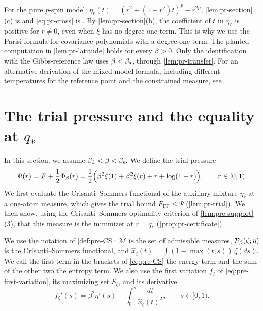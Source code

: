 \begin{remark}\label{rem:pr-cross}
For the pure $p$-spin model, $\eta_r(t)=(r^2+(1-r^2)t)^p-r^{2p}$, \cref{lem:pr-section}(c) is \cite[Proposition~3.7]{ElAlaouiMontanariSellke2025} and \eqref{eq:pr-cross} is \cite[Proposition~3.8]{ElAlaouiMontanariSellke2025}. By \cref{lem:pr-section}(b), the coefficient of $t$ in $\eta_r$ is positive for $r\ne0$, even when $\xi$ has no degree-one term. This is why we use the Parisi formula for covariance polynomials with a degree-one term. The planted computation in \cref{lem:pr-latitude} holds for every $\beta>0$. Only the identification with the Gibbs-reference law uses $\beta<\beta_{\mathrm s}$, through \cref{lem:pr-transfer}. For an alternative derivation of the mixed-model formula, including different temperatures for the reference point and the constrained measure, see \cite[Corollary~2.1 and Eqs.~(2.4)--(2.7)]{DemboSubag2026}.
\end{remark}


\section{The trial pressure and the equality at \texorpdfstring{$q_*$}{q*}}\label{sec:pr-certificate}

In this section, we assume $\beta_{\mathrm d}<\beta<\beta_{\mathrm s}$. We define the trial pressure
\begin{equation}\label{eq:pr-Psi}
\Psi(r)=F+\frac12\Phi_\beta(r)=\frac12\Bigl(\beta^2\xi(1)+\beta^2\xi(r)+r+\log(1-r)\Bigr),\qquad r\in[0,1).
\end{equation}
We first evaluate the Crisanti--Sommers functional of the auxiliary mixture $\eta_r$ at a one-atom measure, which gives the trial bound $F_{\mathrm{FP}}\le\Psi$ (\cref{lem:pr-trial}). We then show, using the Crisanti--Sommers optimality criterion of \cref{lem:pre-support}(3), that this measure is the minimizer at $r=q_*$ (\cref{prop:pr-certificate}).

We use the notation of \cref{def:pre-CS}: $\mathscr M$ is the set of admissible measures, $\mathcal P_\beta(\zeta;\eta)$ is the Crisanti--Sommers functional, and $\hat x_\zeta(t)=\int(1-\max(t,s))\,\zeta(ds)$. We call the first term in the brackets of \eqref{eq:pre-CS} the energy term and the sum of the other two the entropy term. We also use the first variation $f_\zeta$ of \eqref{eq:pre-first-variation}, its maximizing set $S_\zeta$, and its derivative
\begin{equation}\label{eq:pr-fprime}
f_\zeta'(s)=\beta^2\eta'(s)-\int_0^s\frac{dt}{\hat x_\zeta(t)^2},\qquad s\in[0,1).
\end{equation}


